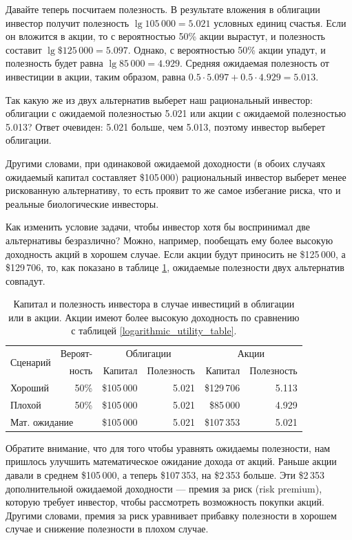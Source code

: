 Давайте теперь посчитаем полезность. В результате вложения в облигации инвестор получит полезность $\lg 105\,000 = 5.021$ условных единиц счастья. Если он вложится в акции, то с вероятностью 50\% акции вырастут, и полезность составит $\lg \$125\,000 = 5.097$. Однако, с вероятностью 50\% акции упадут, и полезность будет равна  $\lg 85\,000 = 4.929$. Средняя ожидаемая полезность от инвестиции в акции, таким образом, равна $0.5 \cdot 5.097 + 0.5 \cdot 4.929 = 5.013$.
 
 
Так какую же из двух альтернатив выберет наш рациональный инвестор: облигации с ожидаемой полезностью 5.021 или акции с ожидаемой полезностью 5.013? Ответ очевиден: 5.021 больше, чем 5.013, поэтому инвестор выберет облигации.

Другими словами, при одинаковой ожидаемой доходности (в обоих случаях ожидаемый капитал составляет \$105\,000) рациональный инвестор выберет менее рискованную альтернативу, то есть проявит то же самое избегание риска, что и реальные биологические инвесторы.

Как изменить условие задачи, чтобы инвестор хотя бы воспринимал две альтернативы безразлично? Можно, например, пообещать ему более высокую доходность акций в хорошем случае. Если акции будут приносить не \$125\,000, а \$129\,706, то, как показано в таблице \ref{logarithmic_utility_table_premium}, ожидаемые полезности двух альтернатив совпадут.

 \begin{table}[h!]
 \centering
 \begin{tabular}{l|r|r|r|r|r}
\multirow{2}{*}{Сценарий} & Вероят- & \multicolumn{2}{c|}{Облигации} & \multicolumn{2}{c}{Акции} \\
\cline{3-6}
        &  ность   & Капитал    & Полезность & Капитал      & Полезность \\ \hline
Хороший & 50\% & \$105\,000 & 5.021    & \$129\,706 & 5.113 \\
Плохой  & 50\% & \$105\,000 & 5.021    & \$85\,000  & 4.929 \\ \hline
\multicolumn{2}{l|}{Мат. ожидание}      & \$105\,000 & 5.021 & \$107\,353 & 5.021
\end{tabular}
\caption{Капитал и полезность инвестора в случае инвестиций в облигации или в акции. Акции имеют более высокую доходность по сравнению с таблицей \ref{logarithmic_utility_table}.}
\label{logarithmic_utility_table_premium}
 \end{table}
 
 Обратите внимание, что для того чтобы уравнять ожидаемы полезности, нам пришлось улучшить математическое ожидание дохода от акций. Раньше акции давали в среднем \$105\,000, а теперь \$107\,353, на \$2\,353 больше. Эти \$2\,353 дополнительной ожидаемой доходности --- премия за риск (risk premium), которую требует инвестор, чтобы рассмотреть возможность покупки акций. Другими словами, премия за риск уравнивает прибавку полезности в хорошем случае и снижение полезности в плохом случае. 
 
